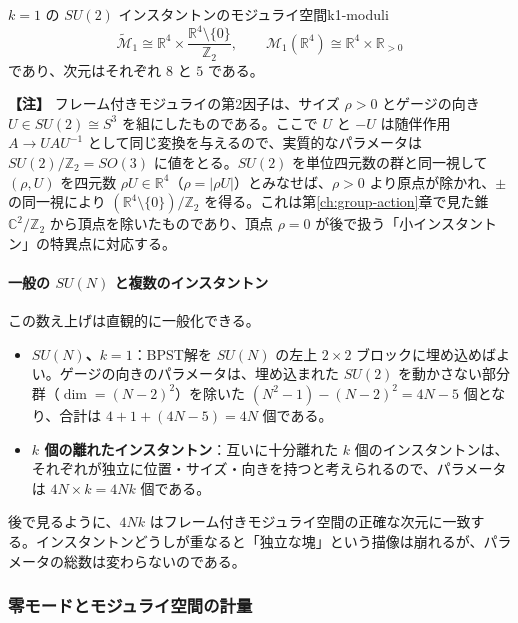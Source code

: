 \documentclass[uplatex, dvipdfmx, book]{jsbook}
\let\origsubsubsection\subsubsection
\renewcommand{\subsection}{\origsubsubsection}
\renewcommand{\subsubsection}{\paragraph}
\newenvironment{note}{\vspace{1ex}\par\footnotesize\noindent\textbf{【注】}}{\par\vspace{1ex}}
\begin{document}
\begin{myprop}{$k = 1$ の $SU(2)$ インスタントンのモジュライ空間}{k1-moduli}
\begin{equation*}
    \widetilde{\mathcal{M}}_1 \cong \mathbb{R}^4 \times \frac{\mathbb{R}^4 \setminus \{0\}}{\mathbb{Z}_2}, \qquad
    \mathcal{M}_1(\mathbb{R}^4) \cong \mathbb{R}^4 \times \mathbb{R}_{>0}
\end{equation*}
であり、次元はそれぞれ $8$ と $5$ である。
\end{myprop}

\begin{note}
フレーム付きモジュライの第2因子は、サイズ $\rho > 0$ とゲージの向き $U \in SU(2) \cong S^3$ を組にしたものである。ここで $U$ と $-U$ は随伴作用 $A \to UAU^{-1}$ として同じ変換を与えるので、実質的なパラメータは $SU(2)/\mathbb{Z}_2 = SO(3)$ に値をとる。$SU(2)$ を単位四元数の群と同一視して $(\rho, U)$ を四元数 $\rho U \in \mathbb{R}^4$（$\rho = |\rho U|$）とみなせば、$\rho > 0$ より原点が除かれ、$\pm$ の同一視により $(\mathbb{R}^4 \setminus \{0\})/\mathbb{Z}_2$ を得る。これは第\ref{ch:group-action}章で見た錐 $\mathbb{C}^2/\mathbb{Z}_2$ から頂点を除いたものであり、頂点 $\rho = 0$ が後で扱う「小インスタントン」の特異点に対応する。
\end{note}

\paragraph{一般の $SU(N)$ と複数のインスタントン}
この数え上げは直観的に一般化できる。
\begin{itemize}
    \item \textbf{$SU(N)$、$k = 1$}：BPST解を $SU(N)$ の左上 $2 \times 2$ ブロックに埋め込めばよい。ゲージの向きのパラメータは、埋め込まれた $SU(2)$ を動かさない部分群（$\dim = (N-2)^2$）を除いた $(N^2 - 1) - (N-2)^2 = 4N - 5$ 個となり、合計は $4 + 1 + (4N - 5) = 4N$ 個である。
    \item \textbf{$k$ 個の離れたインスタントン}：互いに十分離れた $k$ 個のインスタントンは、それぞれが独立に位置・サイズ・向きを持つと考えられるので、パラメータは $4N \times k = 4Nk$ 個である。
\end{itemize}
後で見るように、$4Nk$ はフレーム付きモジュライ空間の正確な次元に一致する。インスタントンどうしが重なると「独立な塊」という描像は崩れるが、パラメータの総数は変わらないのである。

\subsection{零モードとモジュライ空間の計量}
\end{document}

